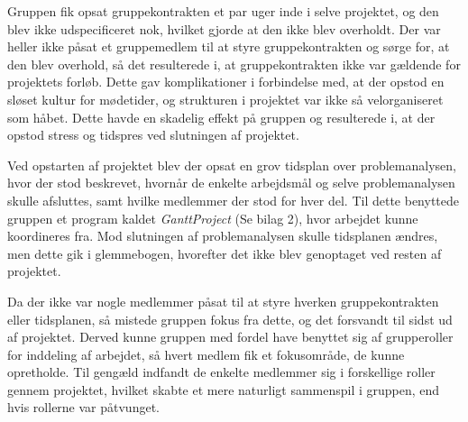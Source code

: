 Gruppen fik opsat gruppekontrakten et par uger inde i selve projektet, og den blev ikke udspecificeret nok, hvilket gjorde at den ikke blev overholdt. Der var heller ikke påsat et gruppemedlem til at styre gruppekontrakten og sørge for, at den blev overhold, så det resulterede i, at gruppekontrakten ikke var gældende for projektets forløb. Dette gav komplikationer i forbindelse med, at der opstod en sløset kultur for mødetider, og strukturen i projektet var ikke så velorganiseret som håbet. Dette havde en skadelig effekt på gruppen og resulterede i, at der opstod stress og tidspres ved slutningen af projektet.

Ved opstarten af projektet blev der opsat en grov tidsplan over problemanalysen, hvor der stod beskrevet, hvornår de enkelte arbejdsmål og selve problemanalysen skulle afsluttes, samt hvilke medlemmer der stod for hver del. Til dette benyttede gruppen et program kaldet \textit{GanttProject} (Se bilag 2), hvor arbejdet kunne koordineres fra. Mod slutningen af problemanalysen skulle tidsplanen ændres, men dette gik i glemmebogen, hvorefter det ikke blev genoptaget ved resten af projektet.

Da der ikke var nogle medlemmer påsat til at styre hverken gruppekontrakten eller tidsplanen, så mistede gruppen fokus fra dette, og det forsvandt til sidst ud af projektet. Derved kunne gruppen med fordel have benyttet sig af grupperoller for inddeling af arbejdet, så hvert medlem fik et fokusområde, de kunne opretholde. Til gengæld indfandt de enkelte medlemmer sig i forskellige roller gennem projektet, hvilket skabte et mere naturligt sammenspil i gruppen, end hvis rollerne var påtvunget.

